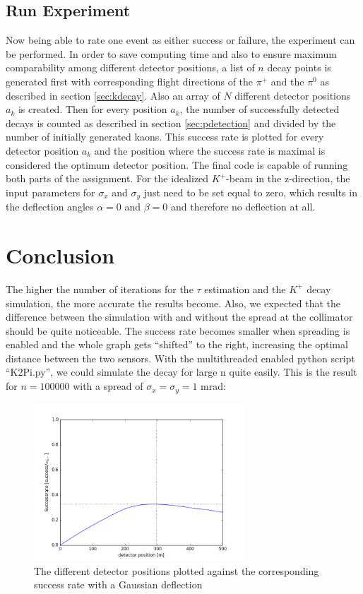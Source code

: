 \documentclass[a4paper,parskip,11pt, DIV12]{scrreprt}
\begin{document}
\clearpage


\section{Run Experiment}

Now being able to rate one event as either success or failure, the experiment can be performed. In order to save computing time and also to ensure maximum comparability among different detector positions, a list of $n$ decay points is generated first with corresponding flight directions of the $\pi^+$ and the $\pi^0$ as described in section \ref{sec:kdecay}. Also an array of $N$ different detector positions $a_k$ is created. Then for every position $a_k$, the number of successfully detected decays is counted as described in section \ref{sec:pdetection} and divided by the number of initially generated kaons. This success rate is plotted for every detector position $a_k$ and the position where the success rate is maximal is considered the optimum detector position. The final code is capable of running both parts of the assignment. For the idealized $K^+$-beam in the z-direction, the input parameters for $\sigma_x$ and $\sigma_y$ just need to be set equal to zero,  which results in the deflection angles $\alpha = 0$ and $\beta = 0$ and therefore no deflection at all.

\clearpage


\chapter{Conclusion}

The higher the number of iterations for the $\tau$ estimation and the $K^+$ decay simulation, the more accurate the results become. 
Also, we expected that the difference between the simulation with and without the spread at the collimator should be quite noticeable. The success rate becomes smaller when spreading is enabled and the whole graph gets “shifted” to the right, increasing the optimal distance between the two sensors. 
With the multithreaded enabled python script “K2Pi.py”, we could simulate the decay for large n quite easily. This is the result for $n = 100000$ with a spread of $\sigma_x=\sigma_y=1$ mrad:

\begin{figure}[h] 
\centering
\includegraphics[width=0.7\textwidth]{Simulation100kWithSpread.png} 
\caption{The different detector positions plotted against the corresponding success rate with a Gaussian deflection}   
\end{figure}
\end{document}
